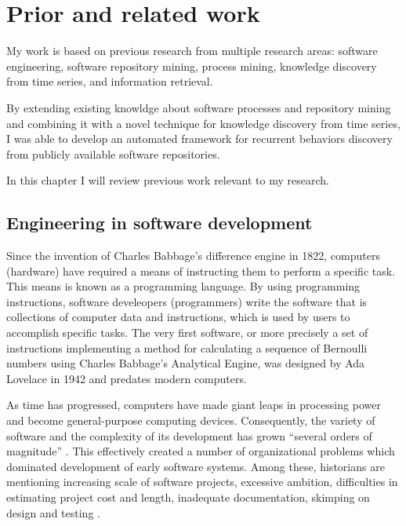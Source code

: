 \chapter{Prior and related work}\label{chapter_background_work}
My work is based on previous research from multiple research areas: software engineering, 
software repository mining, process mining, knowledge discovery from time series,
and information retrieval. 

By extending existing knowldge about software processes and repository mining and combining 
it with a novel technique for knowledge discovery from time series, 
I was able to develop an automated framework for recurrent behaviors discovery from publicly 
available software repositories.

In this chapter I will review previous work relevant to my research.

\section{Engineering in software development}
Since the invention of Charles Babbage’s difference engine in 1822, computers (hardware) 
have required a means of instructing them to perform a specific task. This means is known 
as a programming language. By using programming instructions, software develeopers (programmers)
write the software that is collections of computer data and instructions, which is used by 
users to accomplish specific tasks. The very first software, or more precisely a set of 
instructions implementing a method for calculating a sequence of Bernoulli numbers using 
Charles Babbage's Analytical Engine, was designed by Ada Lovelace in 1942 and predates modern 
computers. 

As time has progressed, computers have made giant leaps in processing power and become 
general-purpose computing devices. Consequently, the variety of software and 
the complexity of its development has grown ``several orders of magnitude'' \cite{naur_crisis_68}. 
This effectively created a number of organizational problems which dominated development of 
early software systems. Among these, historians are mentioning increasing scale of software projects, 
excessive ambition, difficulties in estimating project cost and length, inadequate documentation, 
skimping on design and testing \cite{mahoney_roots_1990} \cite{citeulike:12748733} 
\cite{citeulike:833903}.

